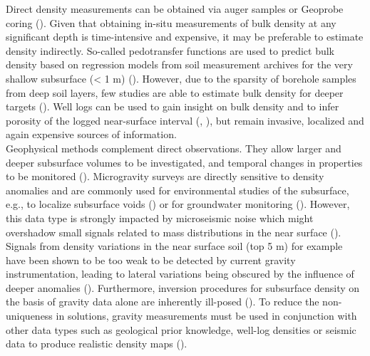 \documentclass{article} %
\begin{document}
	Direct density measurements can be obtained via auger samples or Geoprobe coring (\cite{holbrook2014geophysical}). Given that obtaining in-situ measurements of bulk density at any significant depth is time-intensive and expensive, it may be preferable to estimate density indirectly. So-called pedotransfer functions are used to predict bulk density based on regression models from soil measurement archives for the very shallow subsurface (< 1 m) (\cite{suuster2011soil}). However, due to the sparsity of borehole samples from deep soil layers, few studies are able to estimate bulk density for deeper targets (\cite{qiao2019development}). Well logs can be used to gain insight on bulk density and to infer porosity of the logged near-surface interval (\cite{FANCHI2010109}, \cite{holbrook2019links}), but remain invasive, localized and again expensive sources of information.\\

	Geophysical methods complement direct observations. They allow larger and deeper subsurface volumes to be investigated, and temporal changes in properties to be monitored (\cite{parsekian2015multiscale}).  Microgravity surveys are directly sensitive to density anomalies and are commonly used for environmental studies of the subsurface, e.g., to localize subsurface voids (\cite{tuckwell2008use}) or for groundwater monitoring (\cite{piccolroaz2015use}). However, this data type is strongly impacted by microseismic noise which might overshadow small signals related to mass distributions in the near surface (\cite{boddice2022microgravity}). Signals from density variations in the near surface soil (top 5 m) for example have been shown to be too weak to be detected by current gravity instrumentation, leading to lateral variations being obscured by the influence of deeper anomalies (\cite{boddice2019quantifying}). Furthermore, inversion procedures for subsurface density on the basis of gravity data alone are inherently ill-posed (\cite{blom2017synthetic}). To reduce the non-uniqueness in solutions, gravity measurements must be used in conjunction with other data types such as geological prior knowledge, well-log densities or seismic data to produce realistic density maps (\cite{nabighian2005historical}). \\ %
\end{document}
